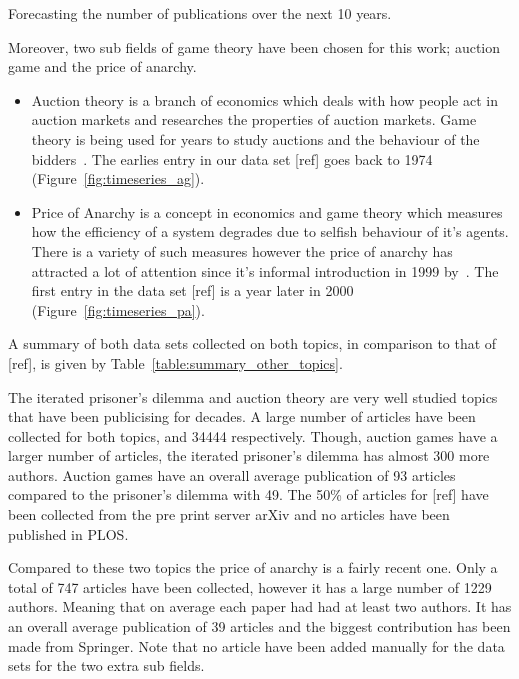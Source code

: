 \documentclass{article}
\theoremstyle{definition}
\newcommand{\totalarticles}{}
\begin{document}
\begin{table}[!hbtp]
    \begin{center}
    
    \end{center}
    \caption{Forecasting the number of publications over the next 10 years.}
    \label{table:forecast}
\end{table}

Moreover, two sub fields of game theory have been chosen for this work; auction game and the
price of anarchy.

\begin{itemize}
    \item Auction theory is a branch of economics which deals with how
    people act in auction markets and researches the properties of auction markets.
    Game theory is being used for years to study auctions and the behaviour of
    the bidders~\cite{Shubik1971}. The earlies entry in our data set [ref] goes
    back to 1974 (Figure~\ref{fig:timeseries_ag}).
    \item Price of Anarchy is a concept in economics and game theory which
    measures how the efficiency of a system degrades due to selfish behaviour of
    it's agents. There is a variety of such measures however the price of anarchy
    has attracted a lot of attention since it's informal introduction in 1999
    by~\cite{Koutsoupias1999}. The first entry in the data set [ref] is a year
    later in 2000 (Figure~\ref{fig:timeseries_pa}).
\end{itemize}

A summary of both data sets collected on both topics, in comparison to that of
[ref], is given by Table~\ref{table:summary_other_topics}.

The iterated prisoner's dilemma and auction theory are very well studied topics
that have been publicising for decades. A large number of articles have
been collected for both topics, \totalarticles and 34444 respectively. Though, auction
games have a larger number of articles, the iterated prisoner's dilemma
has almost 300 more authors. Auction games have an overall average publication
of 93 articles compared to the prisoner's dilemma with 49. The 50\% of articles
for [ref] have been collected from the pre print server arXiv and no articles have
been published in PLOS.

Compared to these two topics the price of anarchy is a fairly recent one. Only a
total of 747 articles have been collected, however it has a large number
of 1229 authors. Meaning that on average each paper had had at least two authors.
It has an overall average publication of 39 articles and the biggest contribution
has been made from Springer. Note that no article have been added manually for
the data sets for the two extra sub fields.
\end{document}

